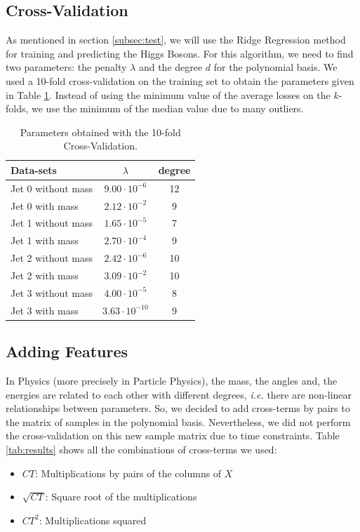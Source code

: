 \documentclass[10pt,conference,compsocconf]{IEEEtran}
\begin{document}
\subsection{Cross-Validation}

As mentioned in section \ref{subsec:test}, we will use the Ridge Regression method for training and predicting the Higgs Bosons. For this algorithm, we need to find two parameters: the penalty $\lambda$ and the degree $d$ for the polynomial basis. We used a 10-fold cross-validation on the training set to obtain the parameters given in Table \ref{tab:cv}. Instead of using the minimum value of the average losses on the $k$-folds, we use the minimum of the median value due to many outliers.  

\begin{table}[h!]
    \centering
    \begin{tabular}{|l||c|c|}
        \hline
        Data-sets & $\lambda$ & degree \\ \hline\hline
        Jet 0 without mass & $9.00\cdot10^{-6}$ & 12 \\ \hline
        Jet 0 with mass & $2.12\cdot10^{-2}$ & 9 \\ \hline
        Jet 1 without mass & $1.65\cdot10^{-5}$ & 7 \\ \hline
        Jet 1 with mass & $2.70\cdot10^{-4}$ & 9 \\ \hline
        Jet 2 without mass & $2.42\cdot10^{-6}$ & 10 \\ \hline
        Jet 2 with mass & $3.09\cdot10^{-2}$ & 10 \\ \hline
        Jet 3 without mass & $4.00\cdot10^{-5}$ & 8 \\ \hline
        Jet 3 with mass & $3.63\cdot10^{-10}$ & 9 \\ \hline
    \end{tabular}
    \caption{Parameters obtained with the 10-fold Cross-Validation.\vspace{-0.8cm}}
    \label{tab:cv}
\end{table} 

\subsection{Adding Features}
\label{sec:cross-terms}

In Physics (more precisely in Particle Physics), the mass, the angles and, the energies are related to each other with different degrees, \emph{i.e.} there are non-linear relationships between parameters. So, we decided to add cross-terms by pairs to the matrix of samples in the polynomial basis. Nevertheless, we did not perform the cross-validation on this new sample matrix due to time constraints. Table \ref{tab:results} shows all the combinations of cross-terms we used:
\begin{itemize}
    \item $CT$: Multiplications by pairs of the columns of $X$
    \item $\sqrt{CT}$: Square root of the multiplications
    \item $CT^2$: Multiplications squared
\end{itemize}
\end{document}
